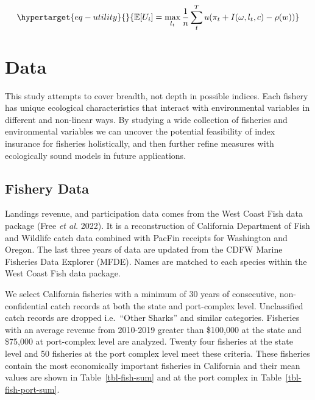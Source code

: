 \documentclass[
  letterpaper,
  DIV=11,
  numbers=noendperiod]{scrartcl}
\begin{document}
\begin{equation}\protect\hypertarget{eq-utility}{}{
\mathbb{E}[U_{i}]=\max_{l_t}\frac{1}{n}\sum_{t}^{T}u(\pi_t+I(\omega,l_t,c)-\rho(w))
}\label{eq-utility}\end{equation}

\hypertarget{sec-data}{%
\section{Data}\label{sec-data}}

This study attempts to cover breadth, not depth in possible indices.
Each fishery has unique ecological characteristics that interact with
environmental variables in different and non-linear ways. By studying a
wide collection of fisheries and environmental variables we can uncover
the potential feasibility of index insurance for fisheries holistically,
and then further refine measures with ecologically sound models in
future applications.

\hypertarget{fishery-data}{%
\subsection{Fishery Data}\label{fishery-data}}

Landings revenue, and participation data comes from the West Coast Fish
data package (Free \emph{et al.} 2022). It is a reconstruction of
California Department of Fish and Wildlife catch data combined with
PacFin receipts for Washington and Oregon. The last three years of data
are updated from the CDFW Marine Fisheries Data Explorer (MFDE). Names
are matched to each species within the West Coast Fish data package.

We select California fisheries with a minimum of 30 years of
consecutive, non-confidential catch records at both the state and
port-complex level. Unclassified catch records are dropped i.e.~``Other
Sharks'' and similar categories. Fisheries with an average revenue from
2010-2019 greater than \$100,000 at the state and \$75,000 at
port-complex level are analyzed. Twenty four fisheries at the state
level and 50 fisheries at the port complex level meet these criteria.
These fisheries contain the most economically important fisheries in
California and their mean values are shown in Table~\ref{tbl-fish-sum}
and at the port complex in Table~\ref{tbl-fish-port-sum}.
\end{document}
